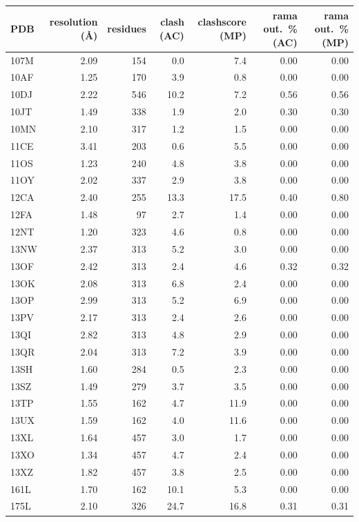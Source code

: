 \begin{longtable}{lrrrrrr}
\toprule
PDB & resolution (\AA) & residues & clash (AC) & clashscore (MP) & rama out.\ \% (AC) & rama out.\ \% (MP) \\
\midrule
\endhead
\bottomrule
\endfoot
107M & 2.09 & 154 & 0.0 & 7.4 & 0.00 & 0.00 \\
10AF & 1.25 & 170 & 3.9 & 0.8 & 0.00 & 0.00 \\
10DJ & 2.22 & 546 & 10.2 & 7.2 & 0.56 & 0.56 \\
10JT & 1.49 & 338 & 1.9 & 2.0 & 0.30 & 0.30 \\
10MN & 2.10 & 317 & 1.2 & 1.5 & 0.00 & 0.00 \\
11CE & 3.41 & 203 & 0.6 & 5.5 & 0.00 & 0.00 \\
11OS & 1.23 & 240 & 4.8 & 3.8 & 0.00 & 0.00 \\
11OY & 2.02 & 337 & 2.9 & 3.8 & 0.00 & 0.00 \\
12CA & 2.40 & 255 & 13.3 & 17.5 & 0.40 & 0.80 \\
12FA & 1.48 & 97 & 2.7 & 1.4 & 0.00 & 0.00 \\
12NT & 1.20 & 323 & 4.6 & 0.8 & 0.00 & 0.00 \\
13NW & 2.37 & 313 & 5.2 & 3.0 & 0.00 & 0.00 \\
13OF & 2.42 & 313 & 2.4 & 4.6 & 0.32 & 0.32 \\
13OK & 2.08 & 313 & 6.8 & 2.4 & 0.00 & 0.00 \\
13OP & 2.99 & 313 & 5.2 & 6.9 & 0.00 & 0.00 \\
13PV & 2.17 & 313 & 2.4 & 2.6 & 0.00 & 0.00 \\
13QI & 2.82 & 313 & 4.8 & 2.9 & 0.00 & 0.00 \\
13QR & 2.04 & 313 & 7.2 & 3.9 & 0.00 & 0.00 \\
13SH & 1.60 & 284 & 0.5 & 2.3 & 0.00 & 0.00 \\
13SZ & 1.49 & 279 & 3.7 & 3.5 & 0.00 & 0.00 \\
13TP & 1.55 & 162 & 4.7 & 11.9 & 0.00 & 0.00 \\
13UX & 1.59 & 162 & 4.0 & 11.6 & 0.00 & 0.00 \\
13XL & 1.64 & 457 & 3.0 & 1.7 & 0.00 & 0.00 \\
13XO & 1.34 & 457 & 4.7 & 2.4 & 0.00 & 0.00 \\
13XZ & 1.82 & 457 & 3.8 & 2.5 & 0.00 & 0.00 \\
161L & 1.70 & 162 & 10.1 & 5.3 & 0.00 & 0.00 \\
175L & 2.10 & 326 & 24.7 & 16.8 & 0.31 & 0.31 \\

\end{longtable}
